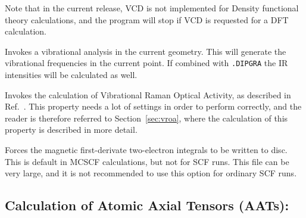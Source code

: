 \begin{description}
Note that in the current release, VCD is not implemented for Density
functional theory calculations, and the program will stop if VCD is
requested for a DFT calculation.


\item[\Key{VIBANA}] Invokes a vibrational analysis in the current
geometry. This will generate the vibrational frequencies in the
current point. If combined with \verb|.DIPGRA| the IR intensities
will be calculated as well. 

\item[\Key{VROA}] Invokes the calculation of Vibrational Raman
Optical Activity, as
described in Ref.~\cite{thkrklbpjjofd99}. This 
property needs a lot of settings in order to perform correctly, and
the reader is therefore referred to Section~\ref{sec:vroa}, where the
calculation of this property is described in more detail.

\item[\Key{WRTINT}] Forces the magnetic first-derivate two-electron
integrals to be written to disc. This is default in MCSCF
calculations, but not for SCF runs. This file can be very large, and
it is not recommended to use this option for ordinary SCF runs.

\end{description}

\subsection{Calculation of Atomic Axial Tensors (AATs):
}\label{sec:aat}  

